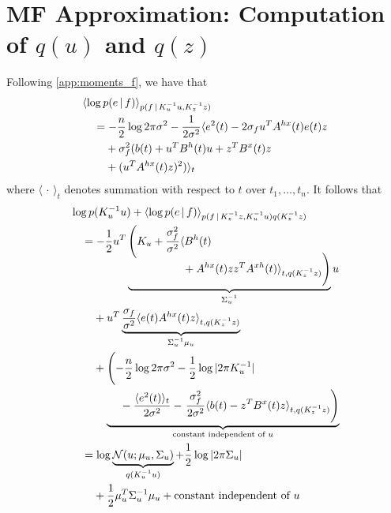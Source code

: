 \documentclass{article}
\newcommand{\id}[1]{\, \mathrm{d} #1}     %
\newcommand{\cond}{\, | \,}               %
\renewcommand{\ll}{\left}
\newcommand{\rr}{\right}
\newcommand{\la}{\langle}
\newcommand{\ra}{\rangle}
\newcommand{\phan}[1]{\hphantom{#1\;}}
\begin{document}

\section{MF Approximation: Computation of $q(u)$ and $q(z)$}
\label{app:computation_quqz}
Following \cref{app:moments_f}, we have that
\begin{align*}
    &\la \log p(e\cond f) \ra_{p(f\cond K_u^{-1} u, K_z^{-1} z)} \\
    &\quad= -\frac{n}{2}\log 2 \pi \sigma^2 - \frac{1}{2 \sigma^2} \la e^{2}(t) - 2 \sigma_f u^T A^{hx}(t) e(t) z\\
    &\quad\phan{=}  + \sigma_f^2 ( b(t) + u^T B^{h}(t) u+ z^T B^{x}(t) z \\
    &\quad\phan{=}  + (u^T A^{hx}(t) z)^2 ) \ra_t
\end{align*}
where $\la\,\cdot\,\ra_t$ denotes summation with respect to $t$ over $t_1,\ldots,t_n$.
It follows that
\begin{align*}
    &\log p(K_u^{-1} u)  + \la \log p(e\cond f) \ra_{p(f\cond K_z^{-1}z, K_u^{-1}u)q(K_z^{-1}z)} \\
    &\quad= -\frac{1}{2}u^T\ll(K_u + \frac{\sigma_f^2}{\sigma^2} \la B^{h}(t) \rr.\\[-3\jot]
    &\quad\phan{= -\frac{1}{2}u^T}
        \underbrace{
            \phan{\ll(K_u + \frac{\sigma_f^2}{\sigma^2} \la \rr. } \!\!\!\!\!
            \ll. \vphantom{\frac{\sigma_f^2}{\sigma^2} }
                 + A^{hx}(t)  z z^T A^{xh}(t) \ra_{t,q(K_z^{-1} z)}
            \rr)
        }_{\Sigma_u^{-1}}u \\
    &\quad\phan{=}+ u^T \underbrace{\frac{\sigma_f}{\sigma^2}\la e(t) A^{hx}(t) z\ra_{t,q(K_z^{-1}z)}}_{\Sigma_u^{-1} \mu_u} \\
    &\quad\phan{=}  + \ll(\vphantom{\frac{\sigma_f^2}{2 \sigma^2}} {-\frac{n}{2}}\log 2 \pi \sigma^2-\frac{1}{2}\log|2 \pi K_u^{-1}|  \rr. \\
    &\quad\phan{=+}\underbrace{\phan{ \ll(\vphantom{\frac{\sigma_f^2}{2 \sigma^2}}\rr.}- \frac{\la e^2(t)\ra_t}{2 \sigma^2} - \ll.\frac{\sigma_f^2}{2 \sigma^2}\la b(t) - z^T B^{x}(t) z\ra_{t,q(K_z^{-1}z)}\rr)}_{\text{constant independent of $u$}} \\
    &\quad= \log \underbrace{\mathcal{N}(u; \mu_u, \Sigma_u)}_{q(K_u^{-1}u)}+ \frac{1}{2}\log|2 \pi \Sigma_u| \\
    &\quad\phan{=}+ \frac{1}{2}\mu_u^T \Sigma_u^{-1}\mu_u  + \text{constant independent of $u$}
\end{align*}
\end{document}
